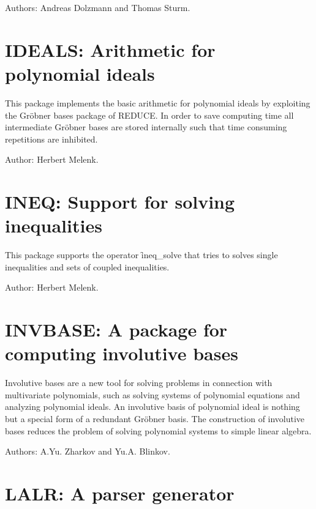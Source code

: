 Authors: Andreas Dolzmann and Thomas Sturm.



\newpage

\section{IDEALS: Arithmetic for polynomial ideals} 

This package implements the basic arithmetic for polynomial ideals by
exploiting the Gr\"obner bases package of REDUCE.  In order to save
computing time all intermediate Gr\"obner bases are stored internally such
that time consuming repetitions are inhibited.

Author: Herbert Melenk.



\newpage

\section{INEQ: Support for solving inequalities} 

This package supports the operator \f{ineq\_solve} that 
tries to solves single inequalities and sets of coupled inequalities.

Author: Herbert Melenk.



\newpage

\section{INVBASE: A package for computing involutive bases} 

Involutive bases are a new tool for solving problems in connection with
multivariate polynomials, such as solving systems of polynomial equations
and analyzing polynomial ideals.  An involutive basis of polynomial ideal
is nothing but a special form of a redundant Gr\"obner basis.  The
construction of involutive bases reduces the problem of solving polynomial
systems to simple linear algebra.

Authors: A.Yu. Zharkov and Yu.A. Blinkov.



\newpage

\section{LALR: A parser generator}

